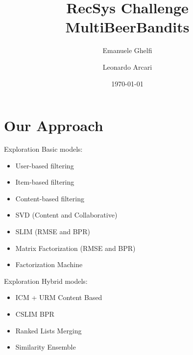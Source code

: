 \documentclass{beamer}
\title{RecSys Challenge \\ MultiBeerBandits}
\date{\today}
\author{Emanuele Ghelfi \and Leonardo Arcari}
\institute{Politecnico di Milano}
\begin{document}
  \maketitle
  \section{Our Approach}
  \begin{frame}{Exploration}
    Basic models:
    		\begin{itemize}
    		\item User-based filtering
    		\item Item-based filtering
    		\item Content-based filtering
    		\item SVD (Content and Collaborative)
    		\item SLIM (RMSE and BPR)
    		\item Matrix Factorization (RMSE and BPR)
    		\item Factorization Machine
		\end{itemize}     
  \end{frame}
  \begin{frame}{Exploration}
    Hybrid models:
    		\begin{itemize}
    		\item ICM + URM Content Based
    		\item CSLIM BPR
    		\item Ranked Lists Merging
    		\item Similarity Ensemble
		\end{itemize}     
  \end{frame}
\end{document}
